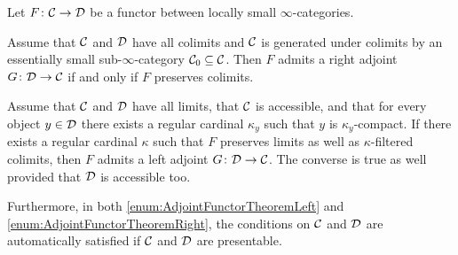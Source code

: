 \begin{satanicthm}\label{thm:AdjointFunctorTheorem}
	Let $F\colon \mathcal{C}\rightarrow\mathcal{D}$ be a functor between locally small $\infty$-categories.
	\begin{alphanumerate}
		\item Assume that $\mathcal{C}$ and $\mathcal{D}$ have all colimits and $\mathcal{C}$ is generated under colimits by an essentially small sub-$\infty$-category $\mathcal{C}_0\subseteq\mathcal{C}$. Then $F$ admits a right adjoint $G\colon \mathcal{D}\rightarrow\mathcal{C}$ if and only if $F$ preserves colimits.\label{enum:AdjointFunctorTheoremLeft}
		\item Assume that $\mathcal{C}$ and $\mathcal{D}$ have all limits, that $\mathcal{C}$ is accessible, and that for every object $y\in\mathcal{D}$ there exists a regular cardinal $\kappa_y$ such that $y$ is $\kappa_y$-compact. If there exists a regular cardinal $\kappa$ such that $F$ preserves limits as well as $\kappa$-filtered colimits, then $F$ admits a left adjoint $G\colon \mathcal{D}\rightarrow\mathcal{C}$. The converse is true as well provided that $\mathcal{D}$ is accessible too.\label{enum:AdjointFunctorTheoremRight}
	\end{alphanumerate}
	Furthermore, in both \cref{enum:AdjointFunctorTheoremLeft} and \cref{enum:AdjointFunctorTheoremRight}, the conditions on $\mathcal{C}$ and $\mathcal{D}$ are automatically satisfied if $\mathcal{C}$ and $\mathcal{D}$ are presentable.\hfill\smash{\GrothendieckRightDevil}
\end{satanicthm}

